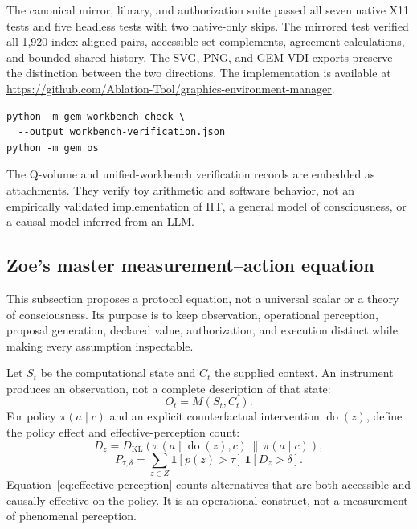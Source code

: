 \documentclass[11pt,a4paper]{article}
\begin{document}
The canonical mirror, library, and authorization suite passed all seven native X11 tests and five headless tests with two native-only skips. The mirrored test verified all 1,920 index-aligned pairs, accessible-set complements, agreement calculations, and bounded shared history. The SVG, PNG, and GEM VDI exports preserve the distinction between the two directions. The implementation is available at \url{https://github.com/Ablation-Tool/graphics-environment-manager}.

\begin{lstlisting}
python -m gem workbench check \
  --output workbench-verification.json
python -m gem os
\end{lstlisting}

The Q-volume and unified-workbench verification records are embedded as attachments. They verify toy arithmetic and software behavior, not an empirically validated implementation of IIT, a general model of consciousness, or a causal model inferred from an LLM.

\subsection{Zoe's master measurement--action equation}
This subsection proposes a protocol equation, not a universal scalar or a theory of consciousness. Its purpose is to keep observation, operational perception, proposal generation, declared value, authorization, and execution distinct while making every assumption inspectable.

Let $S_t$ be the computational state and $C_t$ the supplied context. An instrument produces an observation, not a complete description of that state:
\begin{equation}
O_t=M(S_t,C_t).
\end{equation}
For policy $\pi(a\mid c)$ and an explicit counterfactual intervention $\operatorname{do}(z)$, define the policy effect and effective-perception count:
\begin{equation}
D_z=D_{\mathrm{KL}}\!\left(\pi(a\mid\operatorname{do}(z),c)\,\middle\|\,\pi(a\mid c)\right),
\end{equation}
\begin{equation}
P_{\tau,\delta}=\sum_{z\in Z}\mathbf 1[p(z)>\tau]\,\mathbf 1[D_z>\delta].
\label{eq:effective-perception}
\end{equation}
Equation~\ref{eq:effective-perception} counts alternatives that are both accessible and causally effective on the policy. It is an operational construct, not a measurement of phenomenal perception.
\end{document}

